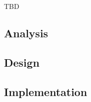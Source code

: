 \documentclass[../main.tex]{subfiles}
\begin{document}
TBD

\subsection{Analysis}


\subsection{Design}


\subsection{Implementation}

\end{document}
